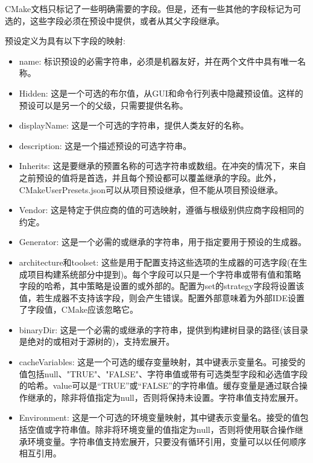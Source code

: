 \begin{tcolorbox}[colback=blue!5!white,colframe=blue!75!black,title=Note]
CMake文档只标记了一些明确需要的字段。但是，还有一些其他的字段标记为可选的，这些字段必须在预设中提供，或者从其父字段继承。
\end{tcolorbox}

预设定义为具有以下字段的映射:

\begin{itemize}
\item 
name: 标识预设的必需字符串，必须是机器友好，并在两个文件中具有唯一名称。

\item 
Hidden: 这是一个可选的布尔值，从GUI和命令行列表中隐藏预设值。这样的预设可以是另一个的父级，只需要提供名称。

\item 
displayName: 这是一个可选的字符串，提供人类友好的名称。

\item 
description: 这是一个描述预设的可选字符串。

\item 
Inherits: 这是要继承的预置名称的可选字符串或数组。在冲突的情况下，来自之前预设的值将是首选，并且每个预设都可以覆盖继承的字段。此外，CMakeUserPresets.json可以从项目预设继承，但不能从项目预设继承。

\item 
Vendor: 这是特定于供应商的值的可选映射，遵循与根级别供应商字段相同的约定。

\item 
Generator: 这是一个必需的或继承的字符串，用于指定要用于预设的生成器。

\item 
architecture和toolset: 这些是用于配置支持这些选项的生成器的可选字段(在生成项目构建系统部分中提到)。每个字段可以只是一个字符串或带有值和策略字段的哈希，其中策略是设置的或外部的。配置为set的strategy字段将设置该值，若生成器不支持该字段，则会产生错误。配置外部意味着为外部IDE设置了字段值，CMake应该忽略它。

\item 
binaryDir: 这是一个必需的或继承的字符串，提供到构建树目录的路径(该目录是绝对的或相对于源树的)，支持宏展开。

\item 
cacheVariables: 这是一个可选的缓存变量映射，其中键表示变量名。可接受的值包括null、"TRUE"、"FALSE"、字符串值或带有可选类型字段和必选值字段的哈希。value可以是“TRUE”或“FALSE”的字符串值。缓存变量是通过联合操作继承的，除非将值指定为null，否则将保持未设置。字符串值支持宏展开。

\item 
Environment: 这是一个可选的环境变量映射，其中键表示变量名。接受的值包括空值或字符串值。除非将环境变量的值指定为null，否则将使用联合操作继承环境变量。字符串值支持宏展开，只要没有循环引用，变量可以以任何顺序相互引用。
\end{itemize}


